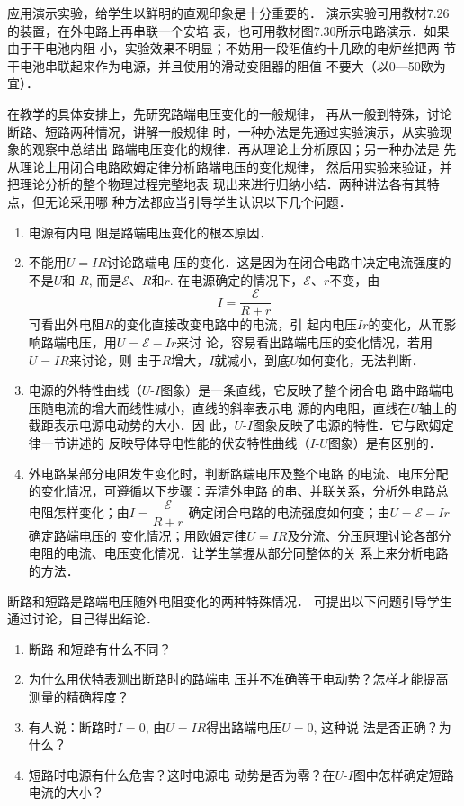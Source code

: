 应用演示实验，给学生以鲜明的直观印象是十分重要的．
演示实验可用教材7.26的装置，在外电路上再串联一个安培
表，也可用教材图7.30所示电路演示．如果由于干电池内阻
小，实验效果不明显；不妨用一段阻值约十几欧的电炉丝把两
节干电池串联起来作为电源，并且使用的滑动变阻器的阻值
不要大（以0—50欧为宜）．

在教学的具体安排上，先研究路端电压变化的一般规律，
再从一般到特殊，讨论断路、短路两种情况，讲解一般规律
时，一种办法是先通过实验演示，从实验现象的观察中总结出
路端电压变化的规律．再从理论上分析原因；另一种办法是
先从理论上用闭合电路欧姆定律分析路端电压的变化规律，
然后用实验来验证，并把理论分析的整个物理过程完整地表
现出来进行归纳小结．两种讲法各有其特点，但无论采用哪
种方法都应当引导学生认识以下几个问题．
\begin{enumerate}
\item 电源有内电
阻是路端电压变化的根本原因．
\item 不能用$U=IR$讨论路端电
压的变化．这是因为在闭合电路中决定电流强度的不是$U$和
$R$, 而是$\mathcal{E}$、$R$和$r$. 在电源确定的情况下，$\mathcal{E}$、$r$不变，由
\[I=\frac{\mathcal{E}}{R+r}\]
可看出外电阻$R$的变化直接改变电路中的电流，引
起内电压$Ir$的变化，从而影响路端电压，用$U=\mathcal{E}-Ir$来讨
论，容易看出路端电压的变化情况，若用$U=IR$来讨论，则
由于$R$增大，$I$就减小，到底$U$如何变化，无法判断．

\item 电源的外特性曲线（$U$-$I$图象）是一条直线，它反映了整个闭合电
路中路端电压随电流的增大而线性减小，直线的斜率表示电
源的内电阻，直线在$U$轴上的截距表示电源电动势的大小．因
此，$U$-$I$图象反映了电源的特性．它与欧姆定律一节讲述的
反映导体导电性能的伏安特性曲线（$I$-$U$图象）是有区别的．
\item 外电路某部分电阻发生变化时，判断路端电压及整个电路
的电流、电压分配的变化情况，可遵循以下步骤：弄清外电路
的串、并联关系，分析外电路总电阻怎样变化；由$I=\dfrac{\mathcal{E}}{R+r}$
确定闭合电路的电流强度如何变；由$U=\mathcal{E}-Ir$确定路端电压的
变化情况；用欧姆定律$U=IR$及分流、分压原理讨论各部分
电阻的电流、电压变化情况．让学生掌握从部分同整体的关
系上来分析电路的方法．
\end{enumerate}



断路和短路是路端电压随外电阻变化的两种特殊情况．
可提出以下问题引导学生通过讨论，自己得出结论．
\begin{enumerate}
\item 断路
和短路有什么不同？
\item 为什么用伏特表测出断路时的路端电
压并不准确等于电动势？怎样才能提高测量的精确程度？
\item 
有人说：断路时$I=0$, 由$U=IR$得出路端电压$U=0$, 这种说
法是否正确？为什么？
\item 短路时电源有什么危害？这时电源电
动势是否为零？在$U$-$I$图中怎样确定短路电流的大小？
\end{enumerate}


